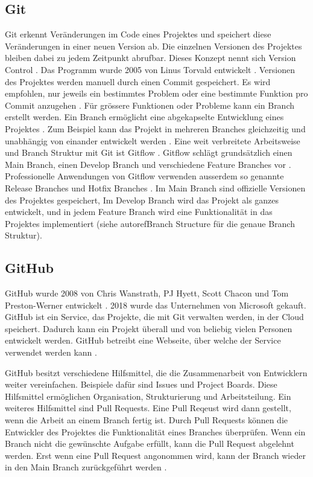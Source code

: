 \subsection{Git}\label{sub:t_git_git} Git erkennt Veränderungen im Code eines
Projektes und speichert diese Veränderungen in einer neuen Version ab. Die
einzelnen Versionen des Projektes bleiben dabei zu jedem Zeitpunkt abrufbar.
Dieses Konzept nennt sich Version Control
\cite{atlassian_git-flow-workflow_nodate}. Das Programm wurde 2005 von Linus
Torvald entwickelt \cite{noauthor_git_2021}. Versionen des Projektes werden
manuell durch einen Commit gespeichert. Es wird empfohlen, nur jeweils ein
bestimmtes Problem oder eine bestimmte Funktion pro Commit anzugehen
\cite{noauthor_5_nodate}. Für grössere Funktionen oder Probleme kann ein Branch
erstellt werden. Ein Branch ermöglicht eine abgekapselte Entwicklung eines
Projektes \cite{guillermo_brachetta_what_2022}. Zum Beispiel kann das Projekt in
mehreren Branches gleichzeitig und unabhängig von einander entwickelt werden
\cite{guillermo_brachetta_what_2022}. Eine weit verbreitete Arbeitsweise und
Branch Struktur mit Git ist Gitflow \cite{noauthor_what_2022}. Gitflow schlägt
grundsätzlich einen Main Branch, einen Develop Branch und verschiedene Feature
Branches vor \cite{atlassian_git-flow-workflow_nodate}. Professionelle
Anwendungen von Gitflow verwenden ausserdem so genannte Release Branches und
Hotfix Branches \cite{cameron_mckenzie_gitflow_2021}. Im Main Branch sind
offizielle Versionen des Projektes gespeichert, Im Develop Branch wird das
Projekt als ganzes entwickelt, und in jedem Feature Branch wird eine
Funktionalität in das Projektes implementiert (siehe autoref{Branch Structure}
für die genaue Branch Struktur). 




\subsection{GitHub}\label{sub:t_git_gh}
GitHub wurde 2008 von Chris Wanstrath, PJ Hyett, Scott Chacon und Tom
Preston-Werner entwickelt \cite{noauthor_github_2021}. 2018 wurde das
Unternehmen von Microsoft gekauft. GitHub ist ein Service, das Projekte, die mit
Git verwalten werden, in der Cloud speichert. Dadurch kann ein Projekt überall
und von beliebig vielen Personen entwickelt werden. GitHub betreibt eine
Webseite, über welche der Service verwendet werden kann
\cite{noauthor_github_2021}.

GitHub besitzt verschiedene Hilfsmittel, die die Zusammenarbeit von Entwicklern
weiter vereinfachen. Beispiele dafür sind Issues und Project Boards. Diese
Hilfsmittel ermöglichen Organisation, Strukturierung und Arbeitsteilung. Ein
weiteres Hilfsmittel sind Pull Requests. Eine Pull Reqeust wird dann gestellt,
wenn die Arbeit an einem Branch fertig ist. Durch Pull Requests können die
Entwickler des Projektes die Funktionalität eines Branches überprüfen. Wenn ein
Branch nicht die gewünschte Aufgabe erfüllt, kann die Pull Request abgelehnt
werden. Erst wenn eine Pull Request angonommen wird, kann der Branch wieder in
den Main Branch zurückgeführt werden \cite{atlassian_pull_nodate}.

